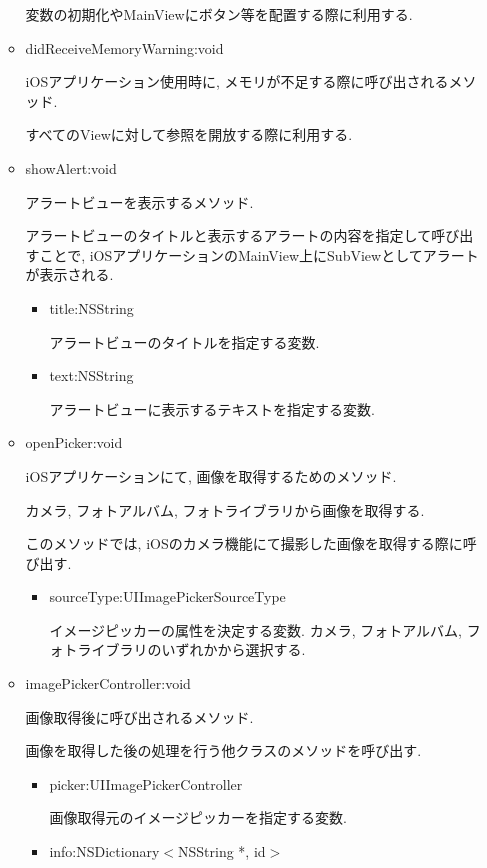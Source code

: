 \begin{itemize}
\begin{itemize}
変数の初期化やMainViewにボタン等を配置する際に利用する.

\item didReceiveMemoryWarning:void

iOSアプリケーション使用時に, メモリが不足する際に呼び出されるメソッド.

すべてのViewに対して参照を開放する際に利用する.

\item showAlert:void

アラートビューを表示するメソッド.

アラートビューのタイトルと表示するアラートの内容を指定して呼び出すことで, iOSアプリケーションのMainView上にSubViewとしてアラートが表示される.

\begin{itemize}
\item title:NSString

アラートビューのタイトルを指定する変数.

\item text:NSString

アラートビューに表示するテキストを指定する変数.
\end{itemize}

\item openPicker:void

iOSアプリケーションにて, 画像を取得するためのメソッド.

カメラ, フォトアルバム, フォトライブラリから画像を取得する.

このメソッドでは, iOSのカメラ機能にて撮影した画像を取得する際に呼び出す.

\begin{itemize}
\item sourceType:UIImagePickerSourceType

イメージピッカーの属性を決定する変数.
カメラ, フォトアルバム, フォトライブラリのいずれかから選択する.
\end{itemize}

\item imagePickerController:void

画像取得後に呼び出されるメソッド.

画像を取得した後の処理を行う他クラスのメソッドを呼び出す.

\begin{itemize}
\item picker:UIImagePickerController

画像取得元のイメージピッカーを指定する変数.

\item info:NSDictionary$<$NSString *, id$>$


\end{itemize}
\end{itemize}
\end{itemize}
